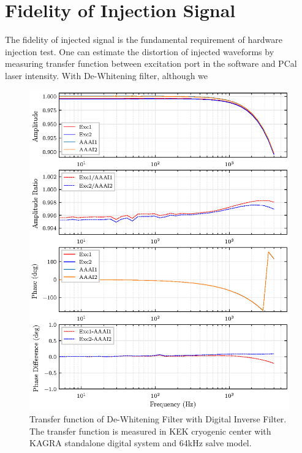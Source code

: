 \section{Fidelity of Injection Signal}
The fidelity of injected signal is the fundamental requirement of hardware injection test. One can estimate the distortion of injected waveforms by measuring transfer function between excitation port in the software and PCal laser intensity. With De-Whitening filter, although we 

\begin{figure}[bt]
\centering
\includegraphics[width=1\textwidth]{figure/tf/TF_KEK_64}
\caption[Transfer function of De-Whitening Filter with Digital Inverse Filter]{Transfer function of De-Whitening Filter with Digital Inverse Filter. The transfer function is measured in KEK cryogenic center with KAGRA standalone digital system and 64kHz salve model.}\label{fig:tf64}
\end{figure}


